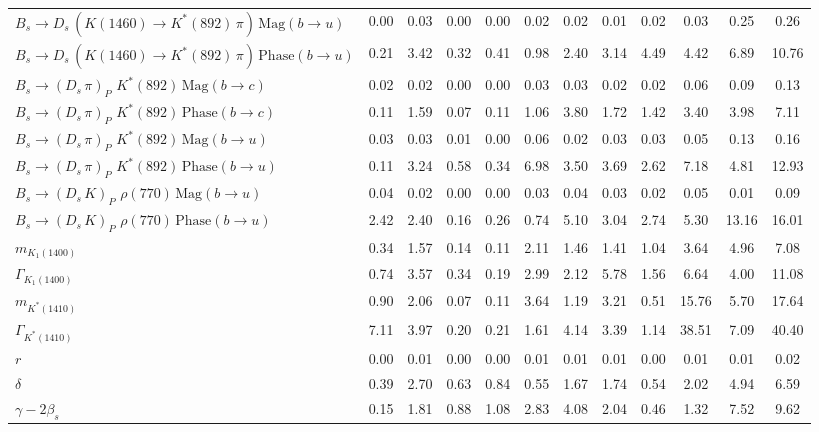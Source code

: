 \begin{tabular}{l  c  c  c  c  c  c  c  c  c  c  | c }
$B_s \to D_s \, ( K(1460) \to K^{*}(892) \, \pi ) \, \text{Mag} (b \to u)$ & 0.00 & 0.03 & 0.00 & 0.00 & 0.02 & 0.02 & 0.01 & 0.02 & 0.03 & 0.25 & 0.26 \\ 
$B_s \to D_s \, ( K(1460) \to K^{*}(892) \, \pi ) \, \text{Phase} (b \to u)$ & 0.21 & 3.42 & 0.32 & 0.41 & 0.98 & 2.40 & 3.14 & 4.49 & 4.42 & 6.89 & 10.76 \\ 
$B_s \to ( D_s \, \pi)_{P} \, \, K^{*}(892) \, \text{Mag} (b \to c)$ & 0.02 & 0.02 & 0.00 & 0.00 & 0.03 & 0.03 & 0.02 & 0.02 & 0.06 & 0.09 & 0.13 \\ 
$B_s \to ( D_s \, \pi)_{P} \, \, K^{*}(892) \, \text{Phase} (b \to c)$ & 0.11 & 1.59 & 0.07 & 0.11 & 1.06 & 3.80 & 1.72 & 1.42 & 3.40 & 3.98 & 7.11 \\ 
$B_s \to ( D_s \, \pi)_{P} \, \, K^{*}(892) \, \text{Mag} (b \to u)$ & 0.03 & 0.03 & 0.01 & 0.00 & 0.06 & 0.02 & 0.03 & 0.03 & 0.05 & 0.13 & 0.16 \\ 
$B_s \to ( D_s \, \pi)_{P} \, \, K^{*}(892) \, \text{Phase} (b \to u)$ & 0.11 & 3.24 & 0.58 & 0.34 & 6.98 & 3.50 & 3.69 & 2.62 & 7.18 & 4.81 & 12.93 \\ 
$B_s \to ( D_s \, K)_{P} \, \, \rho(770) \, \text{Mag} (b \to u)$ & 0.04 & 0.02 & 0.00 & 0.00 & 0.03 & 0.04 & 0.03 & 0.02 & 0.05 & 0.01 & 0.09 \\ 
$B_s \to ( D_s \, K)_{P} \, \, \rho(770) \, \text{Phase} (b \to u)$ & 2.42 & 2.40 & 0.16 & 0.26 & 0.74 & 5.10 & 3.04 & 2.74 & 5.30 & 13.16 & 16.01 \\ 
$m_{K_1(1400)} $ & 0.34 & 1.57 & 0.14 & 0.11 & 2.11 & 1.46 & 1.41 & 1.04 & 3.64 & 4.96 & 7.08 \\ 
$\Gamma_{K_1(1400)}$ & 0.74 & 3.57 & 0.34 & 0.19 & 2.99 & 2.12 & 5.78 & 1.56 & 6.64 & 4.00 & 11.08 \\ 
$m_{K^{*}(1410)}$ & 0.90 & 2.06 & 0.07 & 0.11 & 3.64 & 1.19 & 3.21 & 0.51 & 15.76 & 5.70 & 17.64 \\ 
$\Gamma_{K^{*}(1410)}$ & 7.11 & 3.97 & 0.20 & 0.21 & 1.61 & 4.14 & 3.39 & 1.14 & 38.51 & 7.09 & 40.40 \\ 
$r$ & 0.00 & 0.01 & 0.00 & 0.00 & 0.01 & 0.01 & 0.01 & 0.00 & 0.01 & 0.01 & 0.02 \\ 
$\delta$ & 0.39 & 2.70 & 0.63 & 0.84 & 0.55 & 1.67 & 1.74 & 0.54 & 2.02 & 4.94 & 6.59 \\ 
$\gamma - 2 \beta_{s}$ & 0.15 & 1.81 & 0.88 & 1.08 & 2.83 & 4.08 & 2.04 & 0.46 & 1.32 & 7.52 & 9.62 \\ 
\hline
\hline
\end{tabular}
